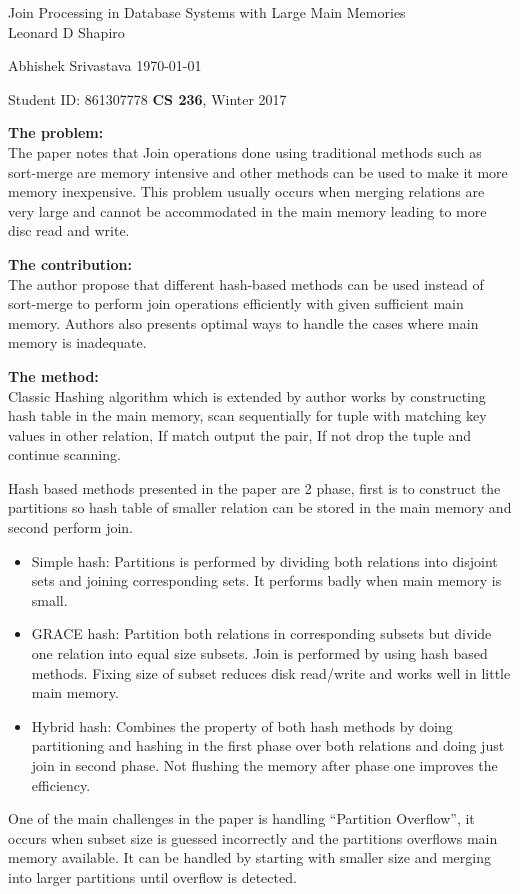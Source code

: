 \documentclass[a4paper,12pt, twoside]{article}
\renewcommand{\maketitle}{%
 	\Large
 	\begin{center}
 	Join Processing in Database Systems with Large Main Memories \\	
 	\normalsize Leonard D Shapiro
 	\end{center}
 
 	\Large
	Abhishek Srivastava
	\hfill
	\normalsize
	\today
 	\par
 	Student ID: 861307778
 	\hfill
 	\textbf{CS 236}, Winter 2017
 	\par 	
 	\hrulefill
 	\par
 	}
\begin{document}
\thispagestyle{empty}
	
\maketitle

\textbf{The problem:}\\
The paper notes that Join operations done using traditional methods such as sort-merge are memory intensive and other methods can be used to make it more memory inexpensive. This problem usually occurs when merging relations are very large and cannot be accommodated in the main memory leading to more disc read and write. 

\textbf{The contribution:}\\
The author propose that different hash-based methods can be used instead of sort-merge to perform join operations efficiently with given sufficient main memory. Authors also presents optimal ways to handle the cases where main memory is inadequate.

\textbf{The method:}\\
Classic Hashing algorithm which is extended by author works by constructing hash table in the main memory, scan sequentially for tuple with matching key values in other relation, If match output the pair, If not drop the tuple and continue scanning.  

Hash based methods presented in the paper are 2 phase, first is to construct the partitions so hash table of smaller relation can be stored in the main memory and second perform join.
\begin{itemize}
	\item Simple hash: Partitions is performed by dividing both relations into disjoint sets and joining corresponding sets. It performs badly when main memory is small. 
	\item GRACE hash: Partition both relations in corresponding subsets but divide one relation into equal size subsets. Join is performed by using hash based methods. Fixing size of subset reduces disk read/write and works well in little main memory.
	\item Hybrid hash: Combines the property of both hash methods by doing partitioning and hashing in the first phase over both relations and doing just join in second phase. Not flushing the memory after phase one improves the efficiency.
\end{itemize}

One of the main challenges in the paper is handling ``Partition Overflow'', it occurs when subset size is guessed incorrectly and the partitions overflows main memory available. It can be handled by starting with smaller size and merging into larger partitions until overflow is detected.
\end{document}
